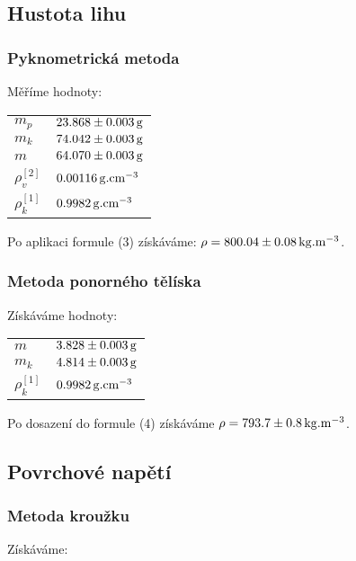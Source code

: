 \documentclass[czech,11pt,a4paper]{article}
\begin{document}
   \subsection{Hustota lihu}
   \subsubsection{Pyknometrická metoda}
   Měříme hodnoty:
   \begin{center}
   	\begin{tabular}{l|l}
   		\hline
   		$m_p$    & $23.868 \pm 0.003 \,\rm g$ \\
   		$m_k$    & $74.042 \pm 0.003 \,\rm g$ \\
   		$m$      & $64.070 \pm 0.003 \,\rm g$ \\
   		$\rho_v ^{[2]}$ & $0.00116 \,\rm g.cm^{-3}$       \\
   		$\rho_k ^{[1]}$ & $0.9982 \,\rm g.cm^{-3}$     \\
   	\end{tabular}
   \end{center}
   Po aplikaci formule (3) získáváme: $\rho = 800.04 \pm 0.08 \,\rm kg . m^{-3}$.
   	
   \subsubsection{Metoda ponorného tělíska}
   Získáváme hodnoty:
   \begin{center}
   	\begin{tabular}{l|l}
   		\hline
   		$m$      & $3.828 \pm 0.003 \,\rm g$ \\
   		$m_k$    & $4.814 \pm 0.003 \,\rm g$ \\
   		$\rho_k^{[1]}$ & $0.9982 \,\rm g.cm^{-3}$   
   	\end{tabular}
   \end{center}
   Po dosazení do formule (4) získáváme $\rho = 793.7 \pm 0.8 \,\rm kg. m^{-3}$.
   \subsection{Povrchové napětí}
   \subsubsection{Metoda kroužku}
   Získáváme:
   
\end{document}

